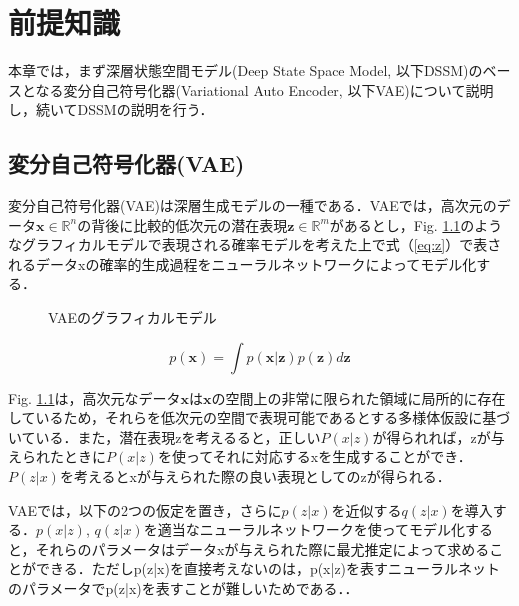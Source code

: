 \chapter{前提知識}
\label{chap:prerequisite}
本章では，まず深層状態空間モデル(Deep State Space Model, 以下DSSM)のベースとなる変分自己符号化器(Variational Auto Encoder, 以下VAE)について説明し，続いてDSSMの説明を行う．

\section{変分自己符号化器(VAE)}
\label{section:vae}
変分自己符号化器(VAE)は深層生成モデルの一種である．VAEでは，高次元のデータ$\bm{x} \in \mathbb{R}^n$の背後に比較的低次元の潜在表現$\bm{z} \in \mathbb{R}^m$があるとし，Fig. \ref{fig:vae}のようなグラフィカルモデルで表現される確率モデルを考えた上で式（\ref{eq:z}）で表されるデータxの確率的生成過程をニューラルネットワークによってモデル化する．

\begin{figure}[tbp]
  \begin{center}
  \caption{VAEのグラフィカルモデル}
  \label{fig:vae}
  \end{center}
  \end{figure}
  
\begin{equation}
  p(\bm{x}) = \int p(\bm{x}|\bm{z}) p(\bm{z}) d\bm{z} \label{eq:vae}
\end{equation}

Fig. \ref{fig:vae}は，高次元なデータ$\bm{x}$は$\bm{x}$の空間上の非常に限られた領域に局所的に存在しているため，それらを低次元の空間で表現可能であるとする多様体仮設に基づいている．また，潜在表現zを考えるると，正しい$P(x|z)$が得られれば，zが与えられたときに$P(x|z)$を使ってそれに対応するxを生成することができ．$P(z|x)$を考えるとxが与えられた際の良い表現としてのzが得られる．

VAEでは，以下の2つの仮定を置き，さらに$p(z|x)$を近似する$q(z|x)$を導入する．$p(x|z)$, $q(z|x)$を適当なニューラルネットワークを使ってモデル化すると，それらのパラメータはデータxが与えられた際に最尤推定によって求めることができる．ただしp(z|x)を直接考えないのは，p(x|z)を表すニューラルネットのパラメータでp(z|x)を表すことが難しいためである．．

